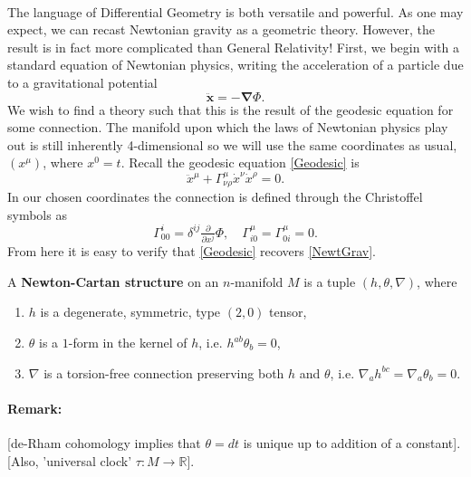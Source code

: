 \documentclass[11pt,fleqn]{report}
\begin{document}
\paragraph{} The language of Differential Geometry is both versatile and powerful. As one may expect, we can recast Newtonian gravity as a geometric theory. However, the result is in fact more complicated than General Relativity! First, we begin with a standard equation of Newtonian physics, writing the acceleration of a particle due to a gravitational potential
	\begin{equation}\label{NewtGrav}
		\ddot{\mathbf{x}} = -\boldsymbol{\nabla} \Phi.
	\end{equation}
We wish to find a theory such that this is the result of the geodesic equation for some connection. The manifold upon which the laws of Newtonian physics play out is still inherently 4-dimensional so we will use the same coordinates as usual, $(x^\mu)$, where $x^0 = t$. Recall the geodesic equation \eqref{Geodesic} is
	\begin{equation}
		\ddot{x}^\mu + \Gamma^\mu_{\nu\rho} \dot{x}^\nu \dot{x}^\rho = 0.
	\end{equation}
In our chosen coordinates the connection is defined through the Christoffel symbols as
	\begin{equation}
		\Gamma^i_{00} = \delta^{ij} \tfrac{\partial}{\partial x^j} \Phi, \quad \Gamma^\mu_{i0} = \Gamma^\mu_{0i} = 0.
	\end{equation}
From here it is easy to verify that \eqref{Geodesic} recovers \eqref{NewtGrav}.


\begin{definition}
	A \textbf{Newton-Cartan structure} on an $n$-manifold $M$ is a tuple $(h,\theta,\nabla)$, where
		\begin{enumerate}[label=(\roman*)]
			\item $h$ is a degenerate, symmetric, type $(2,0)$ tensor,
			\item $\theta$ is a $1$-form in the kernel of $h$, i.e. $h^{ab} \theta_b = 0$,
			\item $\nabla$ is a torsion-free connection preserving both $h$ and $\theta$, i.e. $\nabla_a h^{bc} = \nabla_a \theta_b = 0$.
		\end{enumerate}
\end{definition}

\paragraph{Remark:} [de-Rham cohomology implies that $\theta = dt$ is unique up to addition of a constant]. [Also, 'universal clock' $\tau: M \longrightarrow \mathbb{R}$].
\end{document}
